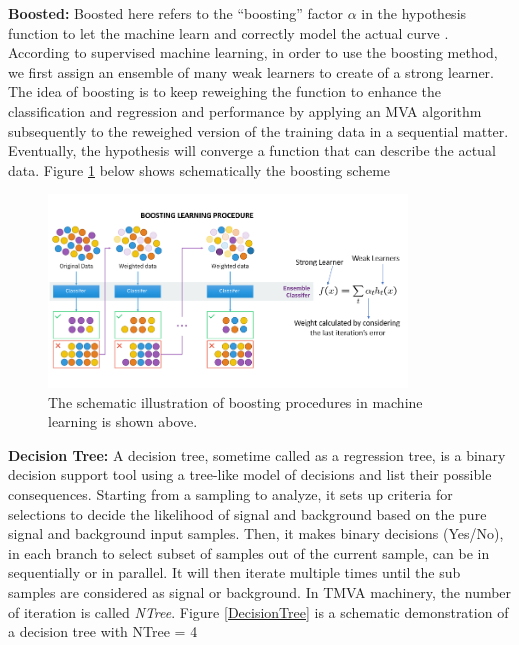 \textbf{Boosted:} Boosted here refers to the ``boosting'' factor $\alpha$ in the hypothesis function to let the machine learn and correctly model the actual curve \cite{BoostingRef}. According to supervised machine learning, in order to use the boosting method, we first assign an ensemble of many weak learners to create of a strong learner. The idea of boosting is to keep reweighing the function to enhance the classification and regression and performance by applying an MVA algorithm subsequently to the reweighed version of the training data in a sequential matter. Eventually, the hypothesis will converge a function that can describe the actual data. Figure \ref{Boosting} below shows schematically the boosting scheme 


\begin{figure}[h]
\begin{center}
\includegraphics[width= 0.85\textwidth]{Figures/Chapter5/Boosting.jpg}
\caption{The schematic illustration of boosting procedures in machine learning is shown above.}
\label{Boosting}
\end{center}
\end{figure}


\textbf{Decision Tree:} A decision tree, sometime called as a regression tree, is a binary decision support tool using a tree-like model of decisions and list their possible consequences. Starting from a sampling to analyze, it sets up criteria for selections to decide the likelihood of signal and background based on the pure signal and background input samples. Then, it makes binary decisions (Yes/No), in each branch to select subset of samples out of the current sample, can be in sequentially or in parallel. It will then iterate multiple times until the sub samples are considered as signal or background. In TMVA machinery, the number of iteration is called \textit{NTree}. Figure \ref{DecisionTree} is a schematic demonstration of a decision tree with NTree = 4

